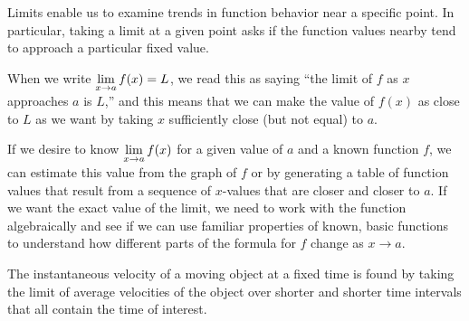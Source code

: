 
\begin{summary}
\item Limits enable us to examine trends in function behavior near a specific point.  In particular, taking a limit at a given point asks if the function values nearby tend to approach a particular fixed value.

\item When we write $\displaystyle \lim_{x \to a} f(x) = L$, we read this as saying ``the limit of $f$ as $x$ approaches $a$ is $L$,'' and this means that we can make the value of $f(x)$ as close to $L$ as we want by taking $x$ sufficiently close (but not equal) to $a$.

\item If we desire to know $\displaystyle \lim_{x \to a} f(x)$ for a given value of $a$ and a known function $f$, we can estimate this value from the graph of $f$ or by generating a table of function values that result from a sequence of $x$-values that are closer and closer to $a$.  If we want the exact value of the limit, we need to work with the function algebraically and see if we can use familiar properties of known, basic functions to understand how different parts of the formula for $f$ change as $x \to a$. 

\item The instantaneous velocity of a moving object at a fixed time is found by taking the limit of average velocities of the object over shorter and shorter time intervals that all contain the time of interest.
\end{summary}

\clearpage

 

\cleardoublepage
